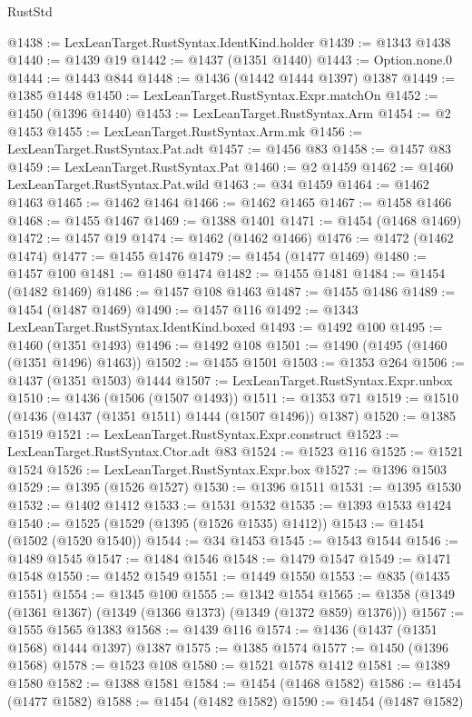 \begin{lexlean}{RustStd}
\begin{coremodule}
@1438 := LexLeanTarget.RustSyntax.IdentKind.holder
@1439 := @1343 @1438
@1440 := @1439 @19
@1442 := @1437 (@1351 @1440)
@1443 := Option.none.{0}
@1444 := @1443 @844
@1448 := @1436 (@1442 @1444 @1397) @1387
@1449 := @1385 @1448
@1450 := LexLeanTarget.RustSyntax.Expr.matchOn
@1452 := @1450 (@1396 @1440)
@1453 := LexLeanTarget.RustSyntax.Arm
@1454 := @2 @1453
@1455 := LexLeanTarget.RustSyntax.Arm.mk
@1456 := LexLeanTarget.RustSyntax.Pat.adt
@1457 := @1456 @83
@1458 := @1457 @83
@1459 := LexLeanTarget.RustSyntax.Pat
@1460 := @2 @1459
@1462 := @1460 LexLeanTarget.RustSyntax.Pat.wild
@1463 := @34 @1459
@1464 := @1462 @1463
@1465 := @1462 @1464
@1466 := @1462 @1465
@1467 := @1458 @1466
@1468 := @1455 @1467
@1469 := @1388 @1401
@1471 := @1454 (@1468 @1469)
@1472 := @1457 @19
@1474 := @1462 (@1462 @1466)
@1476 := @1472 (@1462 @1474)
@1477 := @1455 @1476
@1479 := @1454 (@1477 @1469)
@1480 := @1457 @100
@1481 := @1480 @1474
@1482 := @1455 @1481
@1484 := @1454 (@1482 @1469)
@1486 := @1457 @108 @1463
@1487 := @1455 @1486
@1489 := @1454 (@1487 @1469)
@1490 := @1457 @116
@1492 := @1343 LexLeanTarget.RustSyntax.IdentKind.boxed
@1493 := @1492 @100
@1495 := @1460 (@1351 @1493)
@1496 := @1492 @108
@1501 := @1490 (@1495 (@1460 (@1351 @1496) @1463))
@1502 := @1455 @1501
@1503 := @1353 @264
@1506 := @1437 (@1351 @1503) @1444
@1507 := LexLeanTarget.RustSyntax.Expr.unbox
@1510 := @1436 (@1506 (@1507 @1493))
@1511 := @1353 @71
@1519 := @1510 (@1436 (@1437 (@1351 @1511) @1444 (@1507 @1496)) @1387)
@1520 := @1385 @1519
@1521 := LexLeanTarget.RustSyntax.Expr.construct
@1523 := LexLeanTarget.RustSyntax.Ctor.adt @83
@1524 := @1523 @116
@1525 := @1521 @1524
@1526 := LexLeanTarget.RustSyntax.Expr.box
@1527 := @1396 @1503
@1529 := @1395 (@1526 @1527)
@1530 := @1396 @1511
@1531 := @1395 @1530
@1532 := @1402 @1412
@1533 := @1531 @1532
@1535 := @1393 @1533 @1424
@1540 := @1525 (@1529 (@1395 (@1526 @1535) @1412))
@1543 := @1454 (@1502 (@1520 @1540))
@1544 := @34 @1453
@1545 := @1543 @1544
@1546 := @1489 @1545
@1547 := @1484 @1546
@1548 := @1479 @1547
@1549 := @1471 @1548
@1550 := @1452 @1549
@1551 := @1449 @1550
@1553 := @835 (@1435 @1551)
@1554 := @1345 @100
@1555 := @1342 @1554
@1565 := @1358 (@1349 (@1361 @1367) (@1349 (@1366 @1373) (@1349 (@1372 @859) @1376)))
@1567 := @1555 @1565 @1383
@1568 := @1439 @116
@1574 := @1436 (@1437 (@1351 @1568) @1444 @1397) @1387
@1575 := @1385 @1574
@1577 := @1450 (@1396 @1568)
@1578 := @1523 @108
@1580 := @1521 @1578 @1412
@1581 := @1389 @1580
@1582 := @1388 @1581
@1584 := @1454 (@1468 @1582)
@1586 := @1454 (@1477 @1582)
@1588 := @1454 (@1482 @1582)
@1590 := @1454 (@1487 @1582)

\end{coremodule}
\end{lexlean}
